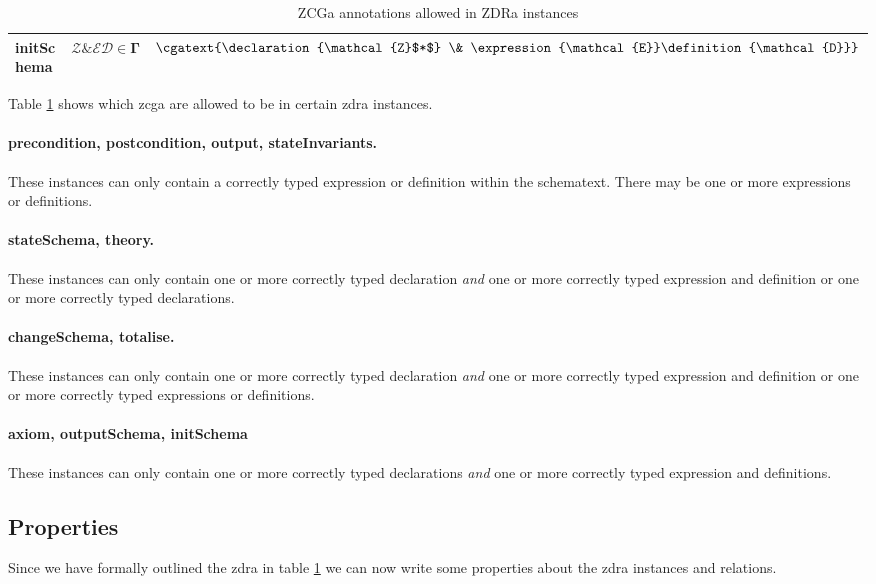 \begin{table}[H]
\begin{footnotesize}
\begin{tabular}{| l | l | l |}
initSchema &
$\mathcal{Z} \& \mathcal{ED} \in \mathbf{\Gamma} $ &
$\cgatext{\declaration{\mathcal{Z}$*$} \& \expression{\mathcal{E}}\definition{\mathcal{D}}}$ \\

\hline
\end{tabular}

\end{footnotesize}
\caption{ZCGa annotations allowed in ZDRa instances \label{tab:zcgainzdra}}
\end{table}

Table \ref{tab:zcgainzdra} shows which \gls{zcga} are allowed to be in certain \gls{zdra} instances.

\paragraph{precondition, postcondition, output, stateInvariants.}
These instances can only contain a correctly typed expression or definition within the schematext. There may be one or more expressions or definitions.

\paragraph{stateSchema, theory.}
These instances can only contain one or more correctly typed declaration \emph{and} one or more correctly typed expression and definition or one or more correctly typed declarations.

\paragraph{changeSchema, totalise.}
These instances can only contain one or more correctly typed declaration \emph{and} one or more correctly typed expression and definition or one or more correctly typed expressions or definitions.

\paragraph{axiom, outputSchema, initSchema}
These instances can only contain one or more correctly typed declarations \emph{and} one or more correctly typed expression and definitions.

\subsection{Properties}

Since we have formally outlined the \gls{zdra} in table \ref{tab:zcgainzdra} we can now write some properties about the \gls{zdra} instances and relations.

